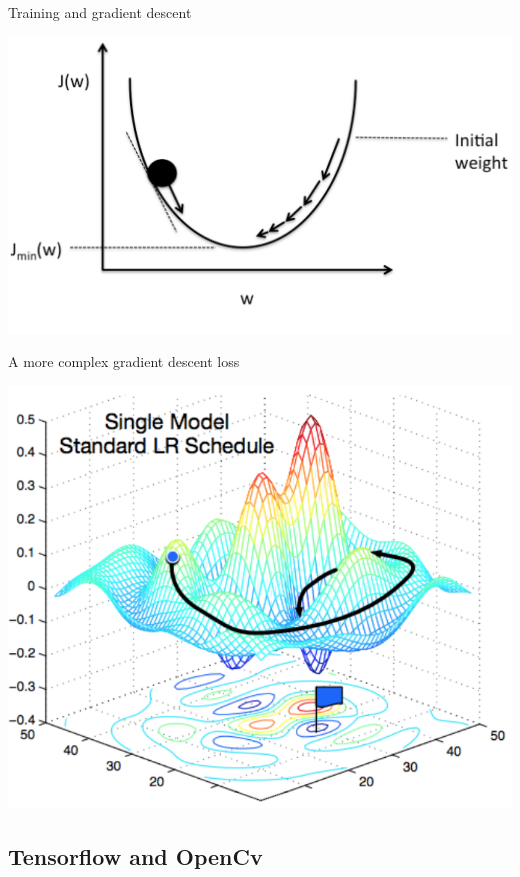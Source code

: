 \documentclass{beamer}
\begin{document}
\begin{frame}{Training and gradient descent}
	\begin{center}
    		\includegraphics[scale=0.4]{grad}
	\end{center}
\end{frame}

\begin{frame}{A more complex gradient descent loss}
	\begin{center}
    		\includegraphics[scale=1.3]{suchcomp}
	\end{center}
\end{frame}

\subsection{Tensorflow and OpenCv}
\end{document}
